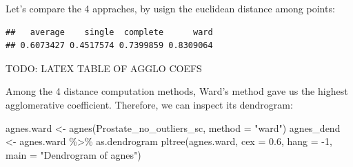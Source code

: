 \documentclass[
]{article}
\newenvironment{Shaded}{\begin{snugshade}}{\end{snugshade}}
\newcommand{\AttributeTok}[1]{\textcolor[rgb]{0.77,0.63,0.00}{#1}}
\newcommand{\CommentTok}[1]{\textcolor[rgb]{0.56,0.35,0.01}{\textit{#1}}}
\newcommand{\ControlFlowTok}[1]{\textcolor[rgb]{0.13,0.29,0.53}{\textbf{#1}}}
\newcommand{\DecValTok}[1]{\textcolor[rgb]{0.00,0.00,0.81}{#1}}
\newcommand{\FloatTok}[1]{\textcolor[rgb]{0.00,0.00,0.81}{#1}}
\newcommand{\FunctionTok}[1]{\textcolor[rgb]{0.00,0.00,0.00}{#1}}
\newcommand{\NormalTok}[1]{#1}
\newcommand{\OtherTok}[1]{\textcolor[rgb]{0.56,0.35,0.01}{#1}}
\newcommand{\SpecialCharTok}[1]{\textcolor[rgb]{0.00,0.00,0.00}{#1}}
\newcommand{\StringTok}[1]{\textcolor[rgb]{0.31,0.60,0.02}{#1}}
\begin{document}
Let's compare the 4 appraches, by usign the euclidean distance among
points:

\begin{Shaded}
\end{Shaded}

\begin{verbatim}
##   average    single  complete      ward 
## 0.6073427 0.4517574 0.7399859 0.8309064
\end{verbatim}

TODO: LATEX TABLE OF AGGLO COEFS

Among the 4 distance computation methods, Ward's method gave us the
highest agglomerative coefficient. Therefore, we can inspect its
dendrogram:

\begin{Shaded}
\begin{Highlighting}[]
\NormalTok{agnes.ward }\OtherTok{\textless{}{-}} \FunctionTok{agnes}\NormalTok{(Prostate\_no\_outliers\_sc, }\AttributeTok{method =} \StringTok{"ward"}\NormalTok{)}
\NormalTok{agnes\_dend }\OtherTok{\textless{}{-}}\NormalTok{ agnes.ward }\SpecialCharTok{\%\textgreater{}\%}\NormalTok{ as.dendrogram}
\FunctionTok{pltree}\NormalTok{(agnes.ward, }\AttributeTok{cex =} \FloatTok{0.6}\NormalTok{, }\AttributeTok{hang =} \SpecialCharTok{{-}}\DecValTok{1}\NormalTok{, }\AttributeTok{main =} \StringTok{"Dendrogram of agnes"}\NormalTok{)}
\end{Highlighting}
\end{Shaded}
\end{document}
